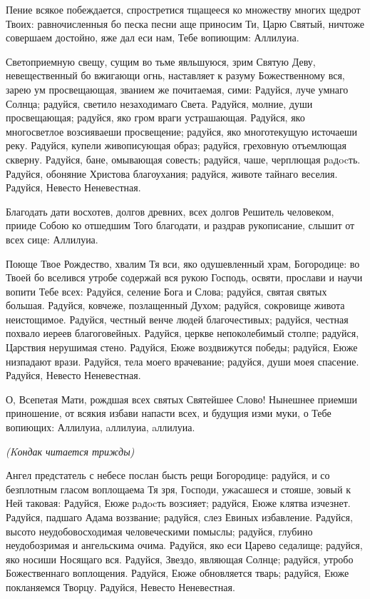 

Пение всякое побеждается, спростретися тщащееся ко множеству многих щедрот Твоих: равночисленныя бо песка песни аще приносим Ти, Царю Святый, ничтоже совершаем достойно, яже дал еси нам, Тебе вопиющим: Аллилуиа.




Светоприемную свещу, сущим во тьме явльшуюся, зрим Святую Деву, невещественный бо вжигающи огнь, наставляет к разуму Божественному вся, зарею ум просвещающая, званием же почитаемая, сими: Радуйся, луче умнаго Солнца; радуйся, светило незаходимаго Света. Радуйся, молние, души просвещающая; радуйся, яко гром враги устрашающая. Радуйся, яко многосветлое возсияваеши просвещение; радуйся, яко многотекущую источаеши реку. Радуйся, купели живописующая образ; радуйся, греховную отъемлющая скверну. Радуйся, бане, омывающая совесть; радуйся, чаше, черплющая рaдocть. Радуйся, обоняние Христова благоухания; радуйся, животе тайнаго веселия. Радуйся, Невесто Неневестная.




Благодать дати восхотев, долгов древних, всех долгов Решитель человеком, прииде Собою ко отшедшим Того благодати, и раздрав рукописание, слышит от всех сице: Аллилуиа.




Поюще Твое Рождество, хвалим Тя вси, яко одушевленный храм, Богородице: во Твоей бо вселився утробе содержай вся рукою Господь, освяти, прослави и научи вопити Тебе всех: Радуйся, селение Бога и Слова; радуйся, святая святых большая. Радуйся, ковчеже, позлащенный Духом; радуйся, сокровище живота неистощимое. Радуйся, честный венче людей благочестивых; радуйся, честная похвало иереев благоговейных. Радуйся, церкве непоколебимый столпе; радуйся, Царствия нерушимая стено. Радуйся, Еюже воздвижутся победы; радуйся, Еюже низпадают врази. Радуйся, тела моего врачевание; радуйся, души моея спасение. Радуйся, Невесто Неневестная.




О, Всепетая Мати, рождшая всех святых Святейшее Слово! Нынешнее приемши приношение, от всякия избави напасти всех, и будущия изми муки, о Тебе вопиющих: Аллилуиа, aллилуиа, aллилуиа.


\itshape (Kондак читается трижды)\normalfont{}




Ангел предстатель с небесе послан бысть рещи Богородице: радуйся, и со безплотным гласом воплощаема Тя зря, Господи, ужасашеся и стояше, зовый к Ней таковая: Радуйся, Еюже рaдocть возсияет; радуйся, Еюже клятва изчезнет. Радуйся, падшаго Адама воззвание; радуйся, слез Евиных избавление. Радуйся, высото неудобовосходимая человеческими помыслы; радуйся, глубино неудобозримая и ангельскима очима. Радуйся, яко еси Царево седалище; радуйся, яко носиши Носящаго вся. Радуйся, Звездо, являющая Солнце; радуйся, утробо Божественнаго воплощения. Радуйся, Еюже обновляется тварь; радуйся, Еюже покланяемся Творцу. Радуйся, Невесто Неневестная.



